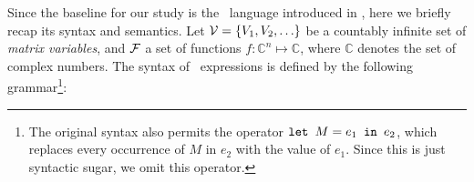 %
%











Since the baseline for our study is the \lang\ language introduced in \cite{matlang}, here we briefly recap its syntax and semantics. Let $\mathcal{V} = \{V_1, V_2, \ldots\}$ be a countably infinite set of {\em matrix variables}, and $\mathcal{F}$ a set of functions $f:\mathbb{C}^n \mapsto \mathbb{C}$, where $\mathbb{C}$ denotes the set of complex numbers. The syntax of \lang\ expressions is defined by the following grammar\footnote{The original syntax also permits the operator $\texttt{let } M = e_1 \texttt{ in } e_2$, which replaces every occurrence of $M$ in $e_2$ with the value of $e_1$. Since this is just syntactic sugar, we omit this operator.}:

